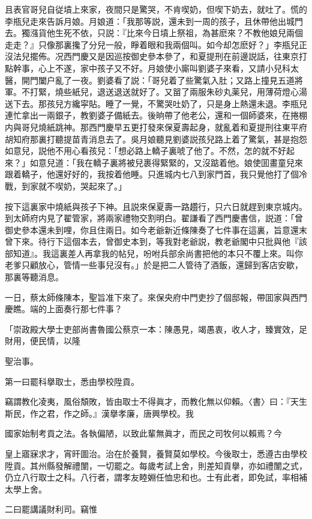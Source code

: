 且表官哥兒自従墳上來家，夜間只是驚哭，不肯喫奶，但喫下奶去，就吐了。慌的李瓶兒走來告訴月娘。月娘道：「我那等説，還未到一周的孩子，且休帶他出城門去。獨漒貨他生死不依，只説：『比來今日墳上祭祖，為甚麽來？不教他娘兒兩個走走？』只像那裏攙了分兒一般，睜着眼和我兩個叫。如今却怎麽好？」李瓶兒正沒法兒擺佈。况西門慶又是因巡按御史參本參了，和夏提刑在前邊説話，往東京打點幹事，心上不遂，家中孩子又不好。月娘使小廝叫劉婆子來看，又請小兒科太醫，開門闔户亂了一夜。劉婆看了説：「哥兒着了些驚氣入肚；又路上撞見五道將軍。不打緊，燒些紙兒，退送退送就好了。又㽞了兩服朱砂丸薬兒，用薄荷燈心湯送下去。那孩兒方纔寜貼。睡了一覺，不驚哭吐奶了，只是身上熱還未退。李瓶兒連忙拿出一兩銀子，教劉婆子備紙去。後晌帶了他老公，還和一個師婆來，在捲棚内與哥兒燒紙跳神。那西門慶早五更打發來保夏壽起身，就亂着和夏提刑往東平府胡知府那裏打聽提苗青消息去了。吳月娘聽見劉婆説孩兒路上着了驚氣，甚是抱怨如意兒，説他不用心看孩兒：「想必路上轎子裏唬了他了。不然，怎的就不好起來？」如意兒道：「我在轎子裏將被兒裹得緊緊的，又沒踮着他。娘使囬畫童兒來跟着轎子，他還好好的，我按着他睡。只進城内七八到家門首，我只覺他打了個冷戰，到家就不喫奶，哭起來了。」

按下這裏家中燒紙與孩子下神。且説來保夏壽一路趲行，只六日就趕到東京城内。到太師府内見了翟管家，將兩家禮物交割明白。翟謙看了西門慶書信，説道：「曾御史參本還未到哩，你且住兩日。如今老爺新近條陳奏了七件事在這裏，旨意還末曾下來。待行下這個本去，曾御史本到，等我對老爺説，教老爺閣中只批與他『該部知道』。我這裏差人再拿我的帖兒，吩咐兵部余尚書把他的本只不覆上來。叫你老爹只顧放心，管情一些事兒沒有。」於是把二人管待了酒飯，還歸到客店安歇，那裏等聽消息。

一日，蔡太師條陳本，聖旨准下來了。來保央府中門吏抄了個邸報，帶囬家與西門慶瞧。端的上面奏行那七件事？

「崇政殿大學士吏部尚書魯國公蔡京一本：陳愚見，竭愚衷，收人才，臻實效，足財用，便民情，以隆

聖治事。

第一曰罷科擧取士，悉由學校陞貢。

竊謂教化凌夷，風俗頽敗，皆由取士不得眞才，而教化無以仰賴。〈書〉曰：『天生斯民，作之君，作之師。』漢擧孝廉，唐興學校。我

國家始制考貢之法。各執偏陋，以致此輩無眞才，而民之司牧何以賴焉？今

皇上寤寐求才，宵旰圖治。治在於養賢，養賢莫如學校。今後取士，悉遵古由學校陞貢。其州縣發解禮闈，一切罷之。每歲考試上舍，則差知貢擧，亦如禮闈之式，仍立八行取士之科。八行者，謂孝友睦婣任恤忠和也。士有此者，即免試，率相補太學上舍。

二曰罷講議財利司。竊惟


